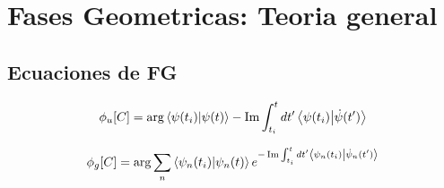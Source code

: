 \chapter{Fases Geometricas: Teoria general}
\label{ch1_fg}


\pagestyle{fancy}
\fancyhf{}
\fancyhead[LE]{\nouppercase{\rightmark\hfill}}
\fancyhead[RO]{\nouppercase{\leftmark\hfill}}
\fancyfoot[LE,RO]{\hfill\thepage\hfill}

\section{Ecuaciones de FG}

\begin{equation}\label{ec:fg_u_cinematica}
    \phi_u[C]=\arg \bra{\psi(t_i)}\ket{\psi(t)}-\Im \int_{t_i}^{t} dt' \bra{\psi(t_i)}\ket{\dot \psi(t')}
\end{equation}

\begin{equation}
    \phi_g[C]=\arg \sum_{n} \bra{\psi_n(t_i)}\ket{\psi_n(t)} e^{-\Im \int_{t_i}^{t} dt' \bra{\psi_n(t_i)}\ket{\dot \psi_n(t')}}
\end{equation}

